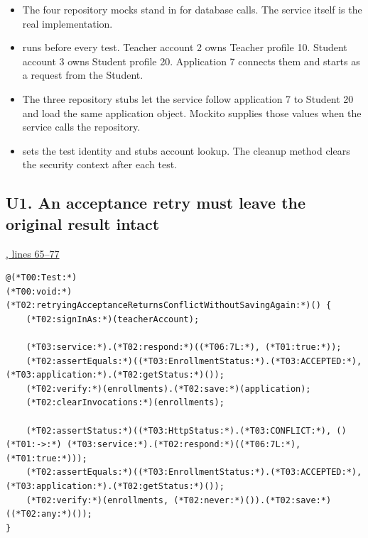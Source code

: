\begin{itemize}
\item The four repository mocks stand in for database calls. The service itself
is the real implementation.
\item {} runs before every test. Teacher account 2 owns Teacher
profile 10. Student account 3 owns Student profile 20. Application 7 connects
them and starts as a request from the Student.
\item The three repository stubs let the service follow application 7 to
Student 20 and load the same application object. Mockito supplies those
values when the service calls the repository.
\item {} sets the test identity and stubs account lookup.
The cleanup method clears the security context after each test.
\end{itemize}

\clearpage
\subsection{U1. An acceptance retry must leave the original result intact}
\par\smallskip
{\small\href{\repo/blob/5d22aed7f6d4ef1e4c0b0c0dabf2962ba4b47608/src/test/java/com/example/fmschool/EnrollmentServiceUnitTests.java#L65-L77}{, lines 65--77}}
\begin{lstlisting}[style=vsJava,firstnumber=65]
@(*T00:Test:*)
(*T00:void:*) (*T02:retryingAcceptanceReturnsConflictWithoutSavingAgain:*)() {
    (*T02:signInAs:*)(teacherAccount);

    (*T03:service:*).(*T02:respond:*)((*T06:7L:*), (*T01:true:*));
    (*T02:assertEquals:*)((*T03:EnrollmentStatus:*).(*T03:ACCEPTED:*), (*T03:application:*).(*T02:getStatus:*)());
    (*T02:verify:*)(enrollments).(*T02:save:*)(application);
    (*T02:clearInvocations:*)(enrollments);

    (*T02:assertStatus:*)((*T03:HttpStatus:*).(*T03:CONFLICT:*), () (*T01:->:*) (*T03:service:*).(*T02:respond:*)((*T06:7L:*), (*T01:true:*)));
    (*T02:assertEquals:*)((*T03:EnrollmentStatus:*).(*T03:ACCEPTED:*), (*T03:application:*).(*T02:getStatus:*)());
    (*T02:verify:*)(enrollments, (*T02:never:*)()).(*T02:save:*)((*T02:any:*)());
}
\end{lstlisting}


